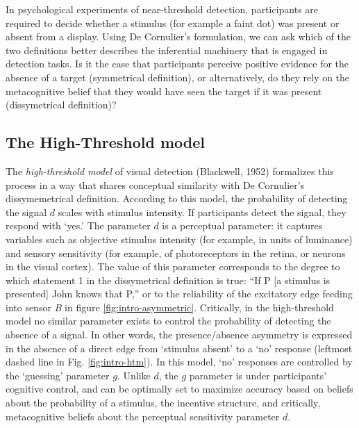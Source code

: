 \documentclass[12pt,twoside]{reedthesis}
\begin{document}
In psychological experiments of near-threshold detection, participants are required to decide whether a stimulus (for example a faint dot) was present or absent from a display. Using De Cornulier's formulation, we can ask which of the two definitions better describes the inferential machinery that is engaged in detection tasks. Is it the case that participants perceive positive evidence for the absence of a target (symmetrical definition), or alternatively, do they rely on the metacognitive belief that they would have seen the target if it was present (dissymetrical definition)?

\hypertarget{htm}{%
\subsection*{The High-Threshold model}\label{htm}}

The \emph{high-threshold model} of visual detection (Blackwell, 1952) formalizes this process in a way that shares conceptual similarity with De Cornulier's dissymemetrical definition. According to this model, the probability of detecting the signal \(d\) scales with stimulus intensity. If participants detect the signal, they respond with `yes.' The parameter \(d\) is a perceptual parameter: it captures variables such as objective stimulus intensity (for example, in units of luminance) and sensory sensitivity (for example, of photoreceptors in the retina, or neurons in the visual cortex). The value of this parameter corresponds to the degree to which statement 1 in the dissymetrical definition is true: ``If P {[}a stimulus is presented{]} John knows that P,'' or to the reliability of the excitatory edge feeding into sensor \emph{B} in figure \ref{fig:intro-asymmetric}. Critically, in the high-threshold model no similar parameter exists to control the probability of detecting the absence of a signal. In other words, the presence/absence asymmetry is expressed in the absence of a direct edge from `stimulus absent' to a `no' response (leftmost dashed line in Fig. \ref{fig:intro-htm}). In this model, `no' responses are controlled by the `guessing' parameter \(g\). Unlike \(d\), the \(g\) parameter is under participants' cognitive control, and can be optimally set to maximize accuracy based on beliefs about the probability of a stimulus, the incentive structure, and critically, metacognitive beliefs about the perceptual sensitivity parameter \(d\).
\end{document}
